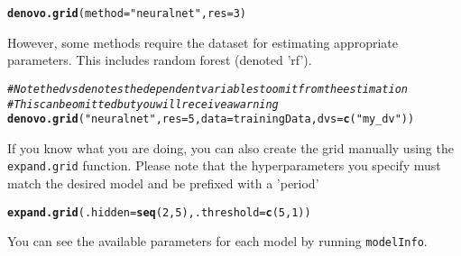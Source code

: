 \documentclass[12pt]{article}\usepackage[]{graphicx}\usepackage[]{color}
\makeatletter
\newcommand{\hlnum}[1]{\textcolor[rgb]{0.686,0.059,0.569}{#1}}%
\newcommand{\hlstr}[1]{\textcolor[rgb]{0.192,0.494,0.8}{#1}}%
\newcommand{\hlcom}[1]{\textcolor[rgb]{0.678,0.584,0.686}{\textit{#1}}}%
\newcommand{\hlstd}[1]{\textcolor[rgb]{0.345,0.345,0.345}{#1}}%
\newcommand{\hlkwc}[1]{\textcolor[rgb]{0.333,0.667,0.333}{#1}}%
\newcommand{\hlkwd}[1]{\textcolor[rgb]{0.737,0.353,0.396}{\textbf{#1}}}%
\newenvironment{kframe}{%
 \def\at@end@of@kframe{}%
 \ifinner\ifhmode%
  \def\at@end@of@kframe{\end{minipage}}%
  \begin{minipage}{\columnwidth}%
 \fi\fi%
 \def\FrameCommand##1{\hskip\@totalleftmargin \hskip-\fboxsep
 \colorbox{shadecolor}{##1}\hskip-\fboxsep
     \hskip-\linewidth \hskip-\@totalleftmargin \hskip\columnwidth}%
 \MakeFramed {\advance\hsize-\width
   \@totalleftmargin\z@ \linewidth\hsize
   \@setminipage}}%
 {\par\unskip\endMakeFramed%
 \at@end@of@kframe}
\newenvironment{knitrout}{}{} %
\newcommand{\Rcode}[1]{\texttt{#1}}
\newcommand{\Rfunction}[1]{\Rcode{#1}}
\makeatother
\begin{document}
\begin{knitrout}
\color{fgcolor}\begin{kframe}
\begin{alltt}
\hlkwd{denovo.grid}\hlstd{(}\hlkwc{method} \hlstd{=} \hlstr{"neuralnet"}\hlstd{,} \hlkwc{res} \hlstd{=} \hlnum{3}\hlstd{)}
\end{alltt}
\end{kframe}
\end{knitrout}

However, some methods require the dataset for estimating appropriate parameters.  This
includes random forest (denoted 'rf').

\begin{knitrout}
\color{fgcolor}\begin{kframe}
\begin{alltt}
\hlcom{# Note the dvs denotes the dependent variables to omit from the estimation}
\hlcom{# This can be omitted but you will receive a warning}
\hlkwd{denovo.grid}\hlstd{(}\hlstr{"neuralnet"}\hlstd{,} \hlkwc{res}\hlstd{=}\hlnum{5}\hlstd{,} \hlkwc{data}\hlstd{=trainingData,} \hlkwc{dvs}\hlstd{=}\hlkwd{c}\hlstd{(}\hlstr{"my_dv"}\hlstd{))}
\end{alltt}
\end{kframe}
\end{knitrout}

If you know what you are doing, you can also create the grid manually using the \Rfunction{expand.grid}
function.  Please note that the hyperparameters you specify must match the desired model and
be prefixed with a 'period'

\begin{knitrout}
\color{fgcolor}\begin{kframe}
\begin{alltt}
\hlkwd{expand.grid}\hlstd{(}\hlkwc{.hidden} \hlstd{=} \hlkwd{seq}\hlstd{(}\hlnum{2}\hlstd{,}\hlnum{5}\hlstd{),} \hlkwc{.threshold} \hlstd{=} \hlkwd{c}\hlstd{(}\hlnum{5}\hlstd{,} \hlnum{1}\hlstd{))}
\end{alltt}
\end{kframe}
\end{knitrout}

You can see the available parameters for each model by running \Rfunction{modelInfo}.

\maketitle
\end{document}
